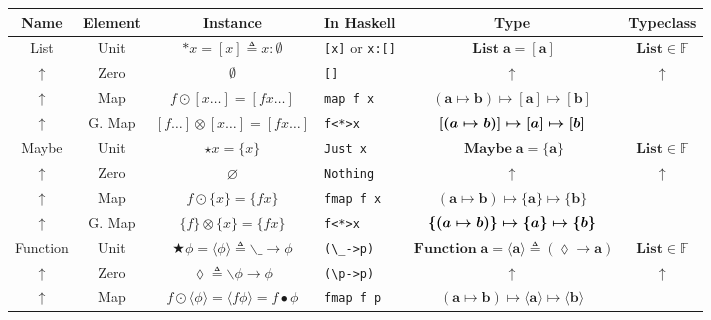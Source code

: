 \documentclass{jsarticle}
\newcommand{\boldsym}[1]{{\boldsymbol{#1}}}
\newcommand{\htypename}[1]{\mathbf{#1}}
\newcommand{\htypeclassname}[1]{\mathbb{#1}}
\begin{document}
\begin{center}
\begin{tabular}{||c|c||c|l|c|c||}\hline
Name&Element&Instance&In Haskell&Type&Typeclass\\\hline
\hline
List
    &Unit
    &$\ast x=[x]\triangleq x:\emptyset$
    &\texttt{[x]} or \texttt{x:[]}
    &$\mathop{\textbf{List}}\htypename{a}=\boldsym{[a]}$
    &$\textbf{List}\in\htypeclassname{F}$\\
    \hline
$\uparrow$
    &Zero
    &$\emptyset$
    &\texttt{[]}
    &$\uparrow$
    &$\uparrow$\\
    \hline
$\uparrow$
    &Map
    &$f\odot[x\dots]=[fx\dots]$
    &\texttt{map f x}
    &$(\htypename{a}\mapsto\htypename{b})\mapsto\boldsym{[a]}\mapsto\boldsym{[b]}$
    &\\
    \hline
$\uparrow$
    &G. Map
    &$[f\dots]\otimes[x\dots]=[fx\dots]$
    &\texttt{f<*>x}
    &$\boldsym{[}(\boldmath{a}\mapsto\boldmath{b})\boldsym{]}\mapsto\boldsym{[a]}\mapsto\boldsym{[b]}$
    &\\
    \hline
    \hline
Maybe
    &Unit
    &$\star x=\{x\}$
    &\texttt{Just x}
    &$\mathop{\textbf{Maybe}}\htypename{a}=\boldsym{\{a\}}$
    &$\textbf{List}\in\htypeclassname{F}$\\
    \hline
$\uparrow$
    &Zero
    &$\varnothing$
    &\texttt{Nothing}
    &$\uparrow$
    &$\uparrow$\\
    \hline
$\uparrow$
    &Map
    &$f\odot\{x\}=\{fx\}$
    &\texttt{fmap f x}
    &$(\htypename{a}\mapsto\htypename{b})\mapsto\boldsym{\{a\}}\mapsto\boldsym{\{b\}}$
    &\\
    \hline
$\uparrow$
    &G. Map
    &$\{f\}\otimes\{x\}=\{fx\}$
    &\texttt{f<*>x}
    &$\boldsym{\{}(\boldmath{a}\mapsto\boldmath{b})\boldsym{\}}\mapsto\boldsym{\{a\}}\mapsto\boldsym{\{b\}}$
    &\\
    \hline
    \hline
Function
    &Unit
    &$\bigstar\phi=\langle\phi\rangle\triangleq \backslash\_\longrightarrow\phi$
    &\verb|(\_->p)|
    &$\mathop{\textbf{Function}}\htypename{a}=\boldsym{\langle a\rangle}\triangleq(\lozenge\rightarrow\htypename{a})$
    &$\textbf{List}\in\htypeclassname{F}$\\
    \hline
$\uparrow$
    &Zero
    &$\lozenge\triangleq\backslash\phi\longrightarrow\phi$
    &\verb|(\p->p)|
    &$\uparrow$
    &$\uparrow$\\
    \hline
$\uparrow$
    &Map
    &$f\odot\langle\phi\rangle=\langle f\phi\rangle=f\bullet\phi$
    &\texttt{fmap f p}
    &$(\htypename{a}\mapsto\htypename{b})\mapsto\boldsym{\langle a\rangle}\mapsto\boldsym{\langle b\rangle}$

\end{tabular}
\end{center}
\end{document}
